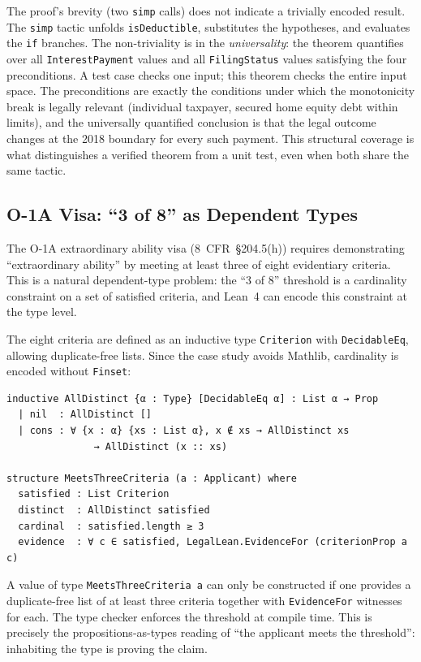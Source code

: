 \documentclass[runningheads]{llncs}
\begin{document}
The proof's brevity (two \texttt{simp} calls) does not indicate a trivially
encoded result. The \texttt{simp} tactic unfolds \texttt{isDeductible},
substitutes the hypotheses, and evaluates the \texttt{if} branches. The
non-triviality is in the \textit{universality}: the theorem quantifies over all
\texttt{InterestPayment} values and all \texttt{FilingStatus} values satisfying
the four preconditions. A test case checks one input; this theorem checks the
entire input space. The preconditions are exactly the conditions under which the
monotonicity break is legally relevant (individual taxpayer, secured home equity
debt within limits), and the universally quantified conclusion is that the legal
outcome changes at the 2018 boundary for every such payment. This structural
coverage is what distinguishes a verified theorem from a unit test, even when
both share the same tactic.

\subsection{O-1A Visa: ``3 of 8'' as Dependent Types}

The O-1A extraordinary ability visa (8~CFR~\S204.5(h)) requires demonstrating
``extraordinary ability'' by meeting at least three of eight evidentiary
criteria. This is a natural dependent-type problem: the ``3 of 8'' threshold is
a cardinality constraint on a set of satisfied criteria, and Lean~4 can encode
this constraint at the type level.

The eight criteria are defined as an inductive type \texttt{Criterion} with
\texttt{DecidableEq}, allowing duplicate-free lists. Since the case study avoids
Mathlib, cardinality is encoded without \texttt{Finset}:

\begin{lstlisting}[language=lean4]
inductive AllDistinct {α : Type} [DecidableEq α] : List α → Prop
  | nil  : AllDistinct []
  | cons : ∀ {x : α} {xs : List α}, x ∉ xs → AllDistinct xs
               → AllDistinct (x :: xs)

structure MeetsThreeCriteria (a : Applicant) where
  satisfied : List Criterion
  distinct  : AllDistinct satisfied
  cardinal  : satisfied.length ≥ 3
  evidence  : ∀ c ∈ satisfied, LegalLean.EvidenceFor (criterionProp a c)
\end{lstlisting}

A value of type \texttt{MeetsThreeCriteria a} can only be constructed if one
provides a duplicate-free list of at least three criteria together with
\texttt{EvidenceFor} witnesses for each. The type checker enforces the threshold
at compile time. This is precisely the propositions-as-types reading of ``the
applicant meets the threshold'': inhabiting the type is proving the claim.
\end{document}
